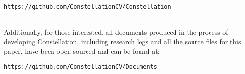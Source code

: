 \documentclass[preprint,12pt]{elsarticle}
\begin{document}
\begin{centering}
\texttt{https://github.com/ConstellationCV/Constellation}\\~\\
\end{centering}

Additionally, for those interested, all documents produced in the process of developing Constellation, including research logs and all the source files for this paper, have been open sourced and can be found at:\\

\begin{centering}
\texttt{https://github.com/ConstellationCV/Documents}\\
\end{centering}







\end{document}
